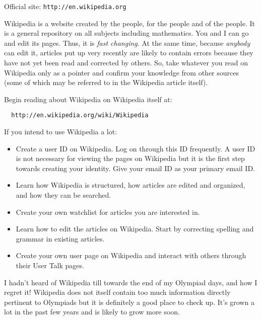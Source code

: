 \documentclass[a4paper]{amsart}
\begin{document}
Official site: 
{\tt http://en.wikipedia.org}

Wikipedia is a website created by the people, for the people and of the people. 
It is a general repository on all subjects including mathematics.
You and I can go and edit its pages.
Thus, it is {\em fast changing}. At the same time, because {\em anybody} can edit it, articles put up very recently are likely
to contain errors because they have not yet been read and corrected by others. So, take whatever you read on Wikipedia
only as a pointer and confirm your knowledge from other sources (some of which may be referred to in the Wikipedia article itself).

Begin reading about Wikipedia on Wikipedia itself at:

\begin{verbatim}
  http://en.wikipedia.org/wiki/Wikipedia
\end{verbatim}

If you intend to use Wikipedia a lot:

\begin{itemize}

\item Create a user ID on Wikipedia. Log on through this ID frequently. 
  A user ID is not necessary for viewing the pages on Wikipedia but it is the first step towards creating your identity.
  Give your email ID as your primary email ID.

\item Learn how Wikipedia is structured, how articles are edited and organized, and how they can be searched.

\item Create your own watchlist for articles you are interested in.

\item Learn how to edit the articles on Wikipedia. Start by correcting spelling and grammar in existing articles.

\item Create your own user page on Wikipedia and interact with others through their User Talk pages.

\end{itemize}

I hadn't heard of Wikipedia till towards the end of my Olympiad days, and how I regret it! Wikipedia does not itself contain
too much information directly pertinent to Olympiads but it is definitely a good place to check up. It's grown a lot in the past
few years and is likely to grow more soon.
\end{document}
